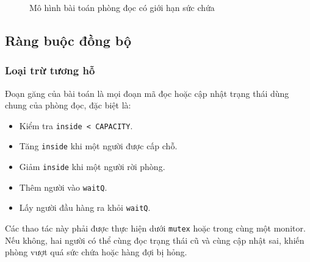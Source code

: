 \begin{figure}[H]
\centering
{}
\caption{Mô hình bài toán phòng đọc có giới hạn sức chứa}
\label{fig:limited-room-model-new-template}
\end{figure}


\subsection{Ràng buộc đồng bộ}

\subsubsection*{Loại trừ tương hỗ}

Đoạn găng của bài toán là mọi đoạn mã đọc hoặc cập nhật trạng thái dùng
chung của phòng đọc, đặc biệt là:

\begin{itemize}
    \item Kiểm tra \texttt{inside < CAPACITY}.
    \item Tăng \texttt{inside} khi một người được cấp chỗ.
    \item Giảm \texttt{inside} khi một người rời phòng.
    \item Thêm người vào \texttt{waitQ}.
    \item Lấy người đầu hàng ra khỏi \texttt{waitQ}.
\end{itemize}

Các thao tác này phải được thực hiện dưới \texttt{mutex} hoặc trong cùng
một monitor. Nếu không, hai người có thể cùng đọc trạng thái cũ và cùng
cập nhật sai, khiến phòng vượt quá sức chứa hoặc hàng đợi bị hỏng.

